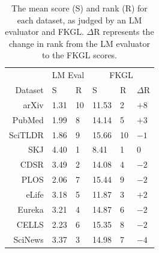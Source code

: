 \begin{table}[h]
\vspace{-2mm}
\centering \footnotesize
\begin{tabular}{r|ll|lll}
 & \multicolumn{2}{c|}{LM Eval} & \multicolumn{3}{c}{FKGL} \\
Dataset & S & R & S & R & $\Delta$R \\ \hline
arXiv & 1.31 & 10 & 11.53 & 2 & $+8$ \\
PubMed & 1.99 & 8 & 14.14 & 5 & $+3$ \\
SciTLDR & 1.86 & 9 & 15.66 & 10 & $-1$ \\
SKJ & 4.40 & 1 & 8.41 & 1 & $0$ \\
CDSR & 3.49 & 2 & 14.08 & 4 & $-2$ \\
PLOS & 2.06 & 7 & 15.44 & 9 & $-2$ \\
eLife & 3.18 & 5 & 11.87 & 3 & $+2$ \\
Eureka & 3.21 & 4 & 14.87 & 6 & $-2$ \\
CELLS & 2.23 & 6 & 15.35 & 8 & $-2$ \\
SciNews & 3.37 & 3 & 14.98 & 7 & $-4$
\end{tabular}
\caption{The mean score (S) and rank (R) for each dataset, as judged by an LM evaluator and FKGL. $\Delta$R represents the change in rank from the LM evaluator to the FKGL scores.}\label{tab:ranked-datasets}
\end{table}